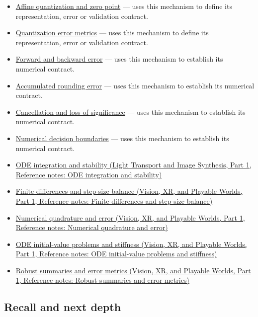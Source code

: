\begin{itemize}
\item
  \hyperref[appendix-d5da3eaabaef]{Affine quantization and zero point} --- uses this mechanism to define its representation, error or validation contract.
\item
  \hyperref[appendix-537171d69d27]{Quantization error metrics} --- uses this mechanism to define its representation, error or validation contract.
\item
  \hyperref[appendix-a7fbaf6d1b1c]{Forward and backward error} --- uses this mechanism to establish its numerical contract.
\item
  \hyperref[appendix-f82e270791c8]{Accumulated rounding error} --- uses this mechanism to establish its numerical contract.
\item
  \hyperref[appendix-a2773a6a2f9d]{Cancellation and loss of significance} --- uses this mechanism to establish its numerical contract.
\item
  \hyperref[appendix-c80db39080be]{Numerical decision boundaries} --- uses this mechanism to establish its numerical contract.
\item
  \href{../04-Light-Transport-and-Image-Synthesis-P01/main.pdf\#nameddest=appendix-18eacf61a04b}{ODE integration and stability (Light Transport and Image Synthesis, Part 1, Reference notes: ODE integration and stability)}
\item
  \href{../07-Vision-XR-and-Playable-Worlds-P01/main.pdf\#nameddest=appendix-e2d7b4f2161d}{Finite differences and step-size balance (Vision, XR, and Playable Worlds, Part 1, Reference notes: Finite differences and step-size balance)}
\item
  \href{../07-Vision-XR-and-Playable-Worlds-P01/main.pdf\#nameddest=appendix-80521eae6b71}{Numerical quadrature and error (Vision, XR, and Playable Worlds, Part 1, Reference notes: Numerical quadrature and error)}
\item
  \href{../07-Vision-XR-and-Playable-Worlds-P01/main.pdf\#nameddest=appendix-e8ab9836882e}{ODE initial-value problems and stiffness (Vision, XR, and Playable Worlds, Part 1, Reference notes: ODE initial-value problems and stiffness)}
\item
  \href{../07-Vision-XR-and-Playable-Worlds-P01/main.pdf\#nameddest=appendix-bcc44e9d3d02}{Robust summaries and error metrics (Vision, XR, and Playable Worlds, Part 1, Reference notes: Robust summaries and error metrics)}
\end{itemize}

\subsection{Recall and next depth}\label{appendix-3ae74e89b4e6-recall-and-next-depth}

